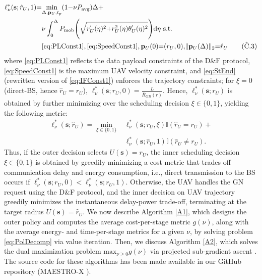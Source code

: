 \documentclass[10pt, twocolumn]{IEEEtran}
\theoremstyle{plain}
\theoremstyle{definition}
\theoremstyle{remark}
\begin{document}
\begin{align}
    \ell_{\nu}^{*}(\mathbf{s};\hat{r}_{U},1){=}&\underset{\Delta,\mathbf{p}_{U},t_{p}}{\mathrm{min}}(1{-}\nu P_{\mathrm{avg}})\Delta+\label{eq:EllMin}\\&\nu\int_{0}^{\Delta}P_{\mathrm{mob}}\Bigg(\sqrt{r_{U}^{'}(\eta)^{2}{+}r_{U}^{2}(\eta)\theta_{U}^{'}(\eta)^{2}}\Bigg)\mathrm{d}\eta\text{ s.t.}\nonumber\\&\text{\ref{eq:PLConst1}},\text{\ref{eq:SpeedConst1}},\mathbf{p}_{U}(0){=}(r_{U},0){,}\Vert\mathbf{p}_{U}(\Delta)\Vert_{2}{=}\hat{r}_{U}\tag{$\hat{\text{C}}$.3}\label{eq:StEnd}
\end{align}
where \ref{eq:PLConst1} reflects the data payload constraints of the D\&F protocol, \ref{eq:SpeedConst1} is the maximum UAV velocity constraint, and \ref{eq:StEnd} (rewritten version of \ref{eq:IFConst1}) enforces the trajectory constraints; for $\xi{=}0$ (direct-BS, hence $\hat{r}_{U}{=}r_{U}$), $\ell_{\nu}^{*}(\mathbf{s};r_{U},0){=}\frac{L}{\bar{R}_{GB}(r)}$. Hence, $\ell_{\nu}^{*}(\mathbf{s};r_{U})$ is obtained by further minimizing over the scheduling decision $\xi{\in}\{0,1\}$, yielding the following metric:
\begin{align}\label{ellnushatru}
	\ell_{\nu}^* (\mathbf{s}; \hat r_U) = \underset{\xi\in\{0,1\}}{\min} &\ell_{\nu}^* (\mathbf{s}; r_U,\xi)\mathbb{I}(\hat r_U = r_U) +\nonumber\\ &\ell_{\nu}^* (\mathbf{s}; \hat r_U, 1)\mathbb{I} (\hat r_U \neq r_U).
\end{align}
Thus, if the outer decision selects $U(\mathbf{s}){=}r_{U}$, the inner scheduling decision $\xi{\in}\{0,1\}$ is obtained by greedily minimizing 
a cost metric that trades off communication delay and energy consumption, i.e., direct transmission to the BS occurs if $\ell_{\nu}^{*}(\mathbf{s}; r_{U},0){<}\ell_{\nu}^{*}(\mathbf{s};r_{U},1)$. Otherwise, the UAV handles the GN request using the D\&F protocol, and the inner decision on UAV trajectory greedily minimizes the instantaneous delay-power trade-off, terminating at the target radius $U(\mathbf{s}){=}\hat{r}_{U}$. We now describe Algorithm \ref{A1}, which designs the outer policy and computes the average cost-per-stage metric $g(\nu)$, along with the average energy- and time-per-stage metrics for a given $\nu$, by solving problem \eqref{eq:PolDecomp} via value iteration. Then, we discuss Algorithm \ref{A2}, which solves the dual maximization problem $\mathrm{max}_{\nu{\geq}0}g(\nu)$ via projected sub-gradient ascent \cite{SubgradientMethods}. The source code for these algorithms has been made available in our GitHub repository (MAESTRO-X \cite{MAESTRO-X}).
\end{document}
